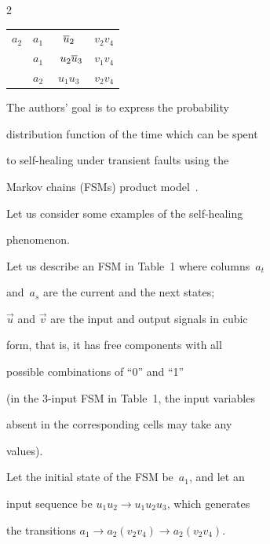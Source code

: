 \begin{multicols}{2}
\begin{center}
{\begin{tabular}{cccc}

\hline

 $a_2$  & $a_1$  & $\overline u_2$        & $v_2v_4$         \\


            &  $a_1$  &\ $u_2\overline u_3$     & $v_1v_4$         \\


            &  $a_2$  & $u_1u_3$     & $v_2v_4$         \\

\hline

\end{tabular}

}

\end{center}



\bigskip





The authors' goal is to  express  the  probability

distribution function of the  time which can be spent

to  self-healing  under transient faults  using the

Markov chains (FSMs) product model~\cite{7fr, 8fr}.

Let us consider some examples of the self-healing

phenomenon.



Let us describe an FSM in Table~1 where columns~$a_t$

and~$a_s$  are the current and the next states;

$\vec u$ and $\vec v$ are the input and output signals in cubic

form, that is, it has free components with all

possible combinations of ``0'' and ``1''

(in the 3-input FSM in Table~1, the input variables

absent in the corresponding cells may take any

values).





Let the initial state of the FSM be~$a_1$, and let an

input sequence be $u_1u_2\to u_1u_2u_3$, which generates

the transitions $a_1\to a_2(v_2v_4)\to a_2(v_2v_4)$.


\end{multicols}
